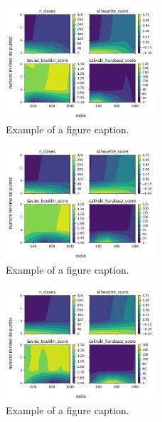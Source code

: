 \begin{figure}[htbp]
\centerline{\includegraphics[width=0.5\textwidth]{graficos_experimentos/dbscan/caracteristicos2_pca0.9.png}}
\caption{Example of a figure caption.}
\label{graficos_experimentos/dbscan/caracteristicos2_pca0.9.png}
\end{figure}
 
\begin{figure}[htbp]
\centerline{\includegraphics[width=0.5\textwidth]{graficos_experimentos/dbscan/caracteristicos2_pca0.95.png}}
\caption{Example of a figure caption.}
\label{graficos_experimentos/dbscan/caracteristicos2_pca0.95.png}
\end{figure}
 
\begin{figure}[htbp]
\centerline{\includegraphics[width=0.5\textwidth]{graficos_experimentos/dbscan/caracteristicos2_pca0.99.png}}
\caption{Example of a figure caption.}
\label{graficos_experimentos/dbscan/caracteristicos2_pca0.99.png}
\end{figure}
 
